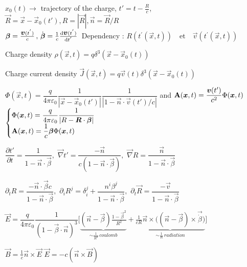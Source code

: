 \begin{squishlist}
\item $x_0(t) \rightarrow$ trajectory of the charge, $t'=t-\frac{R}{c}$, $\vec{R} = \vec{x}-\vec{x}_0(t'), R=|\vec{R}|, \vec{n} = \vec{R}/R$\\
$\vec{\beta} = \frac{\vec{v}(t^{'})}{c} \, , \, \dot{\vec{\beta}} = \frac{1}{c}\frac{\ud \vec{v}(t^{'})}{\ud t^{'}} \, $ Dependency : $R(t^{'}(\vec{x},t))  \quad  \text{et} \quad \vec{v}(t^{'}(\vec{x},t))$

\item Charge density $\rho(\vec x,t) = q\delta^{3}(\vec x-\vec x_{0}(t))$

\item Charge current density $\vec J(\vec x,t) = q\vec v(t)\delta^{3}(\vec x-\vec x_{0}(t))$

\item $\Phi(\vec{x},t) = \dfrac{q}{4\pi\varepsilon_0} \dfrac{1}{|\vec{x} - \vec{x}_0(t')|} \dfrac{1}{|1- \vec{n}\cdot\vec{v}(t')/c|}$ and  $\vec{\rm{A}}(\vec{x},t) = \dfrac{\vec{v}(t')}{c^2} \Phi(\vec{x},t)$
\\
$\begin{cases}
\Phi(\vec{x},t) = \dfrac{q}{4\pi\varepsilon_0} \dfrac{1}{|R-\vec{R}\cdot\vec{\beta}|}
\\
\vec{\rm{A}}(\vec{x},t) = \dfrac{1}{c}\vec{\beta} \Phi(\vec{x},t)
\end{cases}$

\item $\dfrac{\partial t'}{\partial t} = \dfrac{1}{1-\vec{n}\cdot\vec{\beta}}, \,\, \vec{\nabla}t' = \dfrac{-\vec{n}}{c(1-\vec{n}\cdot\vec{\beta})}, \,\, \vec{\nabla}R = \dfrac{\vec{n}}{1-\vec{n}\cdot\vec{\beta}}$

\item $\partial_t R = \dfrac{-\vec{n}\cdot\vec{\beta}c}{1-\vec{n}\cdot\vec{\beta}}, \,\, \partial_i R^j = \delta_i^j + \dfrac{n^i\beta^j}{1-\vec{n}\cdot\vec{\beta}}, \,\, \partial_t \vec{R} = \dfrac{-\vec{v}}{1-\vec{n}\cdot\vec{\beta}}$


\item $\vec{E} =  \dfrac{q}{4\pi\varepsilon_0} \dfrac{1}{ (1-\vec{\beta}\cdot\vec{n})^3} \big[\underbrace{(\vec{n} - \vec{\beta})\frac{1-\vec{\beta}^2}{R^2}}_{\sim \frac{1}{R^2} \, coulomb} + \underbrace{\frac{1}{cR}\vec{n}\times \big( (\vec{n}-\vec{\beta})\times \vec{\dot{\beta}}\big)}_{\sim \frac{1}{R} \, radiation}\big]$
\item $\vec{B} = \frac{1}{c} \vec{n} \times \vec{E}$
\squishsep $\vec{E} = -c (\vec{n}\times \vec{B})$


\end{squishlist}
